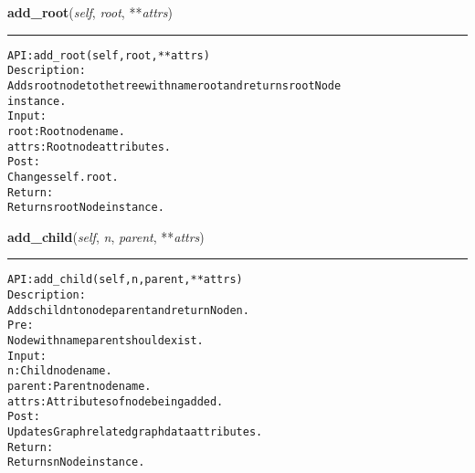     \label{coinor:gimpy:tree:Tree:add_root}

    \vspace{0.5ex}

\hspace{.8\funcindent}\begin{boxedminipage}{\funcwidth}

    \raggedright \textbf{add\_root}(\textit{self}, \textit{root}, **\textit{attrs})

    \vspace{-1.5ex}

    \rule{\textwidth}{0.5\fboxrule}
\setlength{\parskip}{2ex}
\begin{alltt}

API: add\_root(self, root, **attrs)
Description:
    Adds root node to the tree with name root and returns root Node
    instance.
Input:
    root: Root node name.
    attrs: Root node attributes.
Post:
    Changes self.root.
Return:
    Returns root Node instance.
\end{alltt}

\setlength{\parskip}{1ex}
    \end{boxedminipage}

    \label{coinor:gimpy:tree:Tree:add_child}

    \vspace{0.5ex}

\hspace{.8\funcindent}\begin{boxedminipage}{\funcwidth}

    \raggedright \textbf{add\_child}(\textit{self}, \textit{n}, \textit{parent}, **\textit{attrs})

    \vspace{-1.5ex}

    \rule{\textwidth}{0.5\fboxrule}
\setlength{\parskip}{2ex}
\begin{alltt}

API: add\_child(self, n, parent, **attrs)
Description:
    Adds child n to node parent and return Node n.
Pre:
    Node with name parent should exist.
Input:
    n: Child node name.
    parent: Parent node name.
    attrs: Attributes of node being added.
Post:
    Updates Graph related graph data attributes.
Return:
    Returns n Node instance.
\end{alltt}

\setlength{\parskip}{1ex}
    \end{boxedminipage}

